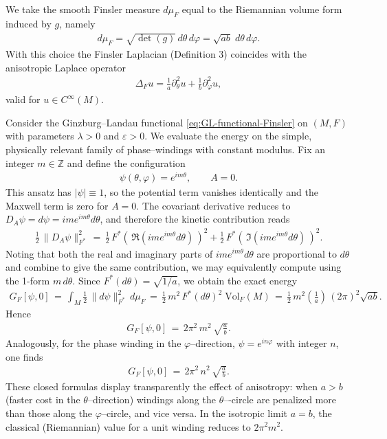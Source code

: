 \documentclass[fleqn,11pt,twoside]{article}
\theoremstyle{definition}
\begin{document}
We take the smooth Finsler measure $d\mu_F$ equal to the Riemannian volume form induced by $g$, namely
\begin{align*}
 d\mu_F = \sqrt{\det(g)}\,d\theta\,d\varphi = \sqrt{ab}\;d\theta\,d\varphi.
\end{align*}
With this choice the Finsler Laplacian (Definition 3) coincides with the anisotropic Laplace operator
\begin{align*}
\Delta_F u = \frac 1a\partial_{\theta}^2 u + 
\frac 1b\partial_{\varphi}^2 u,
\end{align*}
valid for $u\in C^\infty(M)$.

Consider the Ginzburg--Landau functional \eqref{eq:GL-functional-Finsler} on $(M,F)$ with parameters $\lambda>0$ and $\varepsilon>0$. We evaluate the energy on the simple, physically relevant family of 
phase–windings with constant modulus. Fix an integer $m\in\mathbb{Z}$ and define the configuration
\begin{align*}
\psi(\theta,\varphi)=e^{i m\theta},\qquad A=0.
\end{align*}
This ansatz has $|\psi|\equiv 1$, so the potential term vanishes identically and the Maxwell term is zero for $A=0$. The covariant derivative reduces to 
$D_A\psi = d\psi = i m e^{i m\theta}d\theta$, and therefore the kinetic contribution reads
\begin{align*}
\frac 12\,\|D_A\psi\|^2_{F^*} \,=\,\frac 12\,F^*(\,\Re(i m e^{i m\theta}d\theta)\,)^2 + \frac 12\,F^*(\,\Im(i m e^{i m\theta}d\theta)\,)^2.
\end{align*}
Noting that both the real and imaginary parts of $i m e^{i m\theta}d\theta$ are proportional to $d\theta$ and combine to give the same contribution, we may equivalently compute using the 1-form $m\,d\theta$. Since $F^*(d\theta)=\sqrt{1/a}$, we obtain the exact energy
\begin{align*}
G_F[\psi,0] \,=\, \int_M \frac 12\,\|d\psi\|^2_{F^*}\,d\mu_F \,=\, \frac 12\,m^2\,F^*(d\theta)^2\;\mathrm{Vol}_F(M) \,=\, \frac 12\,m^2\left(\frac 1a\right)\,(2\pi)^2\sqrt{ab}.
\end{align*}
Hence
\begin{align*}
G_F[\psi,0] \,=\,2\pi^2\,m^2\,\sqrt{\frac ab}.
\end{align*}
Analogously, for the phase winding in the $\varphi$–direction, $\psi=e^{i n\varphi}$ with integer $n$, one finds
\begin{align*}
G_F[\psi,0] \,=\,2\pi^2\,n^2\,\sqrt{\frac ab}.
\end{align*}
These closed formulas display transparently the effect of anisotropy: when $a>b$ (faster cost in the $\theta$–direction) windings along the $\theta$–-circle are penalized more than those along the $\varphi$–circle, and vice versa. In the isotropic limit $a=b$, the classical (Riemannian) value for a unit winding reduces to $2\pi^2 m^2$.
\end{document}
